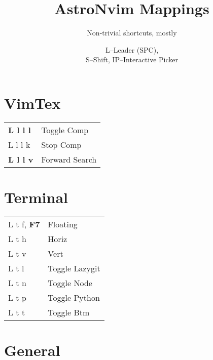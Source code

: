 \documentclass[
  ,landscape
  ,columns=4
]{cheatsheet}
\title{AstroNvim Mappings}
\author{Non-trivial shortcuts, mostly}
\date{L--Leader (SPC),\\S--Shift, IP--Interactive Picker}
\begin{document}
\maketitle

\section{VimTex}

\begin{tabular}{ll}
	\textbf{L l l l} & Toggle Comp    \\
	L l l k          & Stop Comp      \\
	\textbf{L l l v} & Forward Search \\
\end{tabular}

\section{Terminal}

\begin{tabular}{ll}
	L t f, \textbf{F7} & Floating       \\
	L t h              & Horiz          \\
	L t v              & Vert           \\
	L t l              & Toggle Lazygit \\
	L t n              & Toggle Node    \\
	L t p              & Toggle Python  \\
	L t t              & Toggle Btm     \\
\end{tabular}

\section{General}
\end{document}
